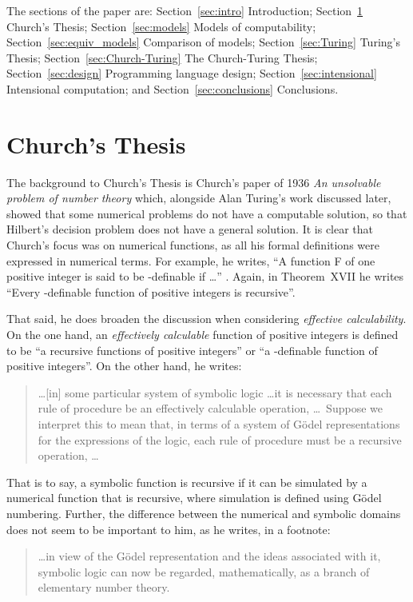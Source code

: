 \documentclass[a4paper]{article}
\begin{document}
The sections of the paper are: Section~\ref{sec:intro} Introduction;
Section~\ref{sec:Church} Church's Thesis; Section~\ref{sec:models}
Models of computability; Section~\ref{sec:equiv_models} Comparison of
models; Section~\ref{sec:Turing} Turing's Thesis;
Section~\ref{sec:Church-Turing} The Church-Turing Thesis;
Section~\ref{sec:design} Programming language design;
Section~\ref{sec:intensional} Intensional computation; and
Section~\ref{sec:conclusions} Conclusions.



\section{Church's Thesis} 
\label{sec:Church}

The background to Church's Thesis is Church's paper of 1936 {\em An
  unsolvable problem of number theory} \cite{Church36} which,
alongside Alan Turing's work discussed later, showed that some
numerical problems do not have a computable solution, so that Hilbert's
decision problem does not have a general solution.  It is clear that
Church's focus was on numerical functions, as all his formal
definitions were expressed in numerical terms. For example, he writes,
``A function F of one positive integer is said to be -definable if
\ldots'' \cite[page 349]{Church36}. Again, in Theorem~XVII he writes
``Every -definable function of positive integers is recursive''.



That said, he does broaden the discussion
when considering {\em effective calculability}. On the one hand, an
{\em effectively calculable} function of positive integers is defined
to be ``a recursive functions of positive integers'' or ``a
-definable function of positive integers''. On the other hand, he writes:
\begin{quote}
\ldots [in] some particular system of symbolic logic \ldots it is
necessary that each rule of procedure be an effectively calculable
operation, \ldots\ Suppose we
interpret this to mean that, in terms of a system of G\"odel
representations for the expressions of the logic, each rule of
procedure must be a recursive operation, \ldots
\end{quote}
That is to say, a symbolic function is recursive if it can be
simulated by a numerical function that is recursive, where simulation
is defined using G\"odel numbering.  Further, the difference between the
numerical and symbolic domains does not seem to be important to him,
as he writes, in a footnote:
\begin{quote}
  \ldots in view of the G\"odel representation and the ideas
  associated with it, symbolic logic can now be regarded,
  mathematically, as a branch of elementary number theory.
\end{quote}
\end{document}
